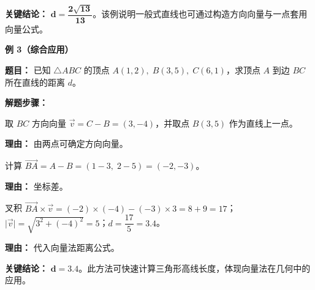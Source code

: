 \begin{examplebox}
	\textbf{\textcolor{CExample}{关键结论：}}
	$\boldsymbol{d=\dfrac{2\sqrt{13}}{13}}$。该例说明一般式直线也可通过构造方向向量与一点套用向量公式。

	\medskip
	\textbf{\textcolor{CExample}{例 3（综合应用）}}

	\textbf{\textcolor{CExample}{题目：}}
	已知 $\triangle ABC$ 的顶点 $A(1,2),\;B(3,5),\;C(6,1)$，求顶点 $A$ 到边 $BC$ 所在直线的距离 $d$。

	\textbf{\textcolor{CExample}{解题步骤：}}
	\begin{description}[style=nextline, leftmargin=2.8em, labelsep=0.5em, itemsep=0.45em]
		\item[\textbf{第一步（方向向量）：}] 取 $BC$ 方向向量 $\vec{v}=C-B=(3,-4)$，并取点 $B(3,5)$ 作为直线上一点。
			\par\textbf{理由：} 由两点可确定方向向量。

		\item[\textbf{第二步（向量坐标）：}] 计算 $\vec{BA}=A-B=(1-3,\;2-5)=(-2,-3)$。
			\par\textbf{理由：} 坐标差。

		\item[\textbf{第三步（距离求解）：}] 叉积 $\vec{BA}\times\vec{v}=(-2)\times(-4)-(-3)\times3=8+9=17$；$\lvert\vec{v}\rvert=\sqrt{3^2+(-4)^2}=5$；$d=\dfrac{17}{5}=3.4$。
			\par\textbf{理由：} 代入向量法距离公式。
	\end{description}

	\textbf{\textcolor{CExample}{关键结论：}}
	$\boldsymbol{d=3.4}$。此方法可快速计算三角形高线长度，体现向量法在几何中的应用。
\end{examplebox}
